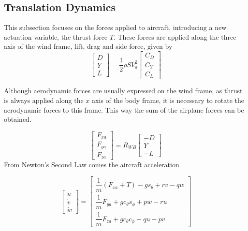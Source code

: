\subsection{Translation Dynamics}
This subsection focuses on the forces applied to aircraft, introducing a new actuation variable, the thrust force $T$. These forces are applied along the three axis of the wind frame, lift, drag and side force, given by
\begin{equation}
\begin{bmatrix}
D\\
Y\\
L
\end{bmatrix}
= \dfrac{1}{2} \rho SV_a^2
\begin{bmatrix}
C_D\\
C_Y\\
C_L
\end{bmatrix}
\label{eq:forces}
\end{equation}

Although aerodynamic forces are usually expressed on the wind frame, as thrust is always applied along the $x$ axis of the body frame, it is necessary to rotate the aerodynamic forces to this frame. This way the sum of the airplane forces can be obtained. 

\begin{equation}
\begin{bmatrix}
F_{xa}\\
F_{ya}\\
F_{za}
\end{bmatrix}
= R_{WB}
\begin{bmatrix}
-D\\
Y\\
-L
\end{bmatrix}
\label{eq:body_forces}
\end{equation}
From Newton's Second Law comes the aircraft acceleration

\begin{equation}
\begin{bmatrix}
\dot{u}\\
\dot{v}\\
\dot{w}
\end{bmatrix}
=
\begin{bmatrix}
\dfrac{1}{m}(F_{xa} + T) - gs_\theta +rv-qw\\
\dfrac{1}{m}F_{ya} + gc_\theta s_\phi + pw - ru\\
\dfrac{1}{m}F_{za} + gc_\theta c_\phi + qu - pv
\end{bmatrix}
\label{eq:boddy_acc}
\end{equation}

